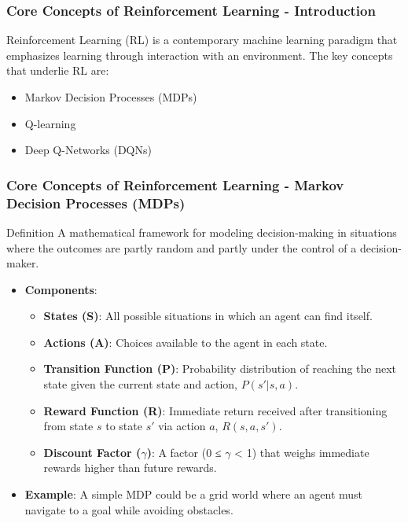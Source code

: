 \documentclass[aspectratio=169]{beamer}
\begin{document}
\begin{frame}[fragile]
    \frametitle{Core Concepts of Reinforcement Learning - Introduction}
    Reinforcement Learning (RL) is a contemporary machine learning paradigm that emphasizes learning through interaction with an environment. The key concepts that underlie RL are:
    \begin{itemize}
        \item Markov Decision Processes (MDPs)
        \item Q-learning
        \item Deep Q-Networks (DQNs)
    \end{itemize}
\end{frame}

\begin{frame}[fragile]
    \frametitle{Core Concepts of Reinforcement Learning - Markov Decision Processes (MDPs)}
    \begin{block}{Definition}
        A mathematical framework for modeling decision-making in situations where the outcomes are partly random and partly under the control of a decision-maker.
    \end{block}
    \begin{itemize}
        \item \textbf{Components}:
        \begin{itemize}
            \item \textbf{States (S)}: All possible situations in which an agent can find itself.
            \item \textbf{Actions (A)}: Choices available to the agent in each state.
            \item \textbf{Transition Function (P)}: Probability distribution of reaching the next state given the current state and action, $P(s'|s, a)$.
            \item \textbf{Reward Function (R)}: Immediate return received after transitioning from state $s$ to state $s'$ via action $a$, $R(s, a, s')$.
            \item \textbf{Discount Factor ($\gamma$)}: A factor (0 ≤ $\gamma$ < 1) that weighs immediate rewards higher than future rewards.
        \end{itemize}
        \item \textbf{Example}: A simple MDP could be a grid world where an agent must navigate to a goal while avoiding obstacles.
    \end{itemize}
\end{frame}
\end{document}
